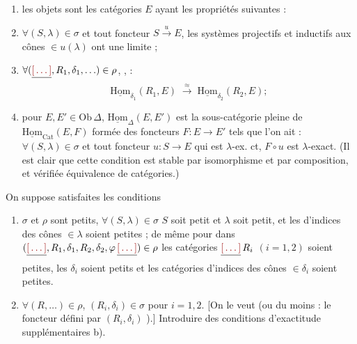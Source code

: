 \documentclass[11pt,a4paper]{article}
\begin{document}
\begin{enumerate}
  \item[a)] les objets sont les catégories $E$ ayant les propriétés suivantes :
  \item[a$_{1}$)] $\forall (S,\lambda) \in \sigma$ et tout foncteur
      $S \xrightarrow{u} E$, les systèmes projectifs et inductifs
      \ill{} aux cônes $\in u(\lambda)$ ont une limite ;
  \item[a$_{2}$)] $\forall (\struck{\ill{}}, R_{1}, \delta_{1}, \ldots) \in
      \rho$, ,
       :
      \[
        \underline{\mathrm{Hom}}_{\delta_{1}}(R_{1}, E)
        \;\xrightarrow{\ \approx\ }\;
        \underline{\mathrm{Hom}}_{\delta_{2}}(R_{2}, E) ;
      \]
  \item[b)] pour $E, E' \in \mathrm{Ob}\,\Delta$,
    $\underline{\mathrm{Hom}}_{\Delta}(E, E')$ est la sous-catégorie pleine
     de $\underline{\mathrm{Hom}}_{\mathrm{Cat}}(E, F)$ formée des
    foncteurs $F : E \to E'$ tels que l'on ait : $\forall (S, \lambda) \in
    \sigma$ et tout foncteur $u : S \to E$ qui est $\lambda$-ex. ct, $F \circ u$
    est $\lambda$-exact. (Il est clair que cette condition est stable par
    isomorphisme et par composition, et vérifiée   équivalence de catégories.)
\end{enumerate}

On suppose satisfaites les conditions

\begin{enumerate}
  \item[A)] $\sigma$ et $\rho$ sont petits,  $\forall (S,\lambda)
    \in \sigma$ $S$ soit petit et $\lambda$ soit petit, et les
      d'indices des cônes $\in \lambda$
    soient petites ; de même pour dans $(\struck{\ill{}}, R_{1}, \delta_{1},
    R_{2}, \delta_{2}, \varphi\,\struck{\ill{}}) \in \rho$ les catégories
    $\struck{\ill{}}\,R_{i}$ $(i = 1, 2)$ soient petites, les $\delta_{i}$
    soient petits et les catégories d'indices des cônes $\in \delta_{i}$
    soient petites.
  \item[B)] $\forall (R, \ldots) \in \rho$, $(R_{i}, \delta_{i}) \in \sigma$
    pour $i = 1, 2$. [On le veut  (ou
    du moins : \struck{\ill{}} le foncteur défini par $(R_{i}, \delta_{i})$
     ).]
    Introduire des conditions d'exactitude supplémentaires b).
\end{enumerate}
\end{document}
